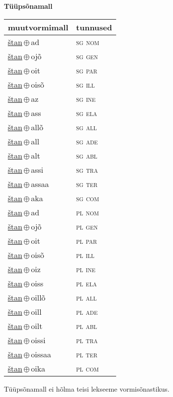 

\vspace{3.5em}
\noindent \begin{minipage}{\textwidth}
\noindent \textbf{Tüüpsõnamall \,}\\

\begin{sideways}
\begin{tabular}{l l}
muutvormimall & tunnused \\
\hline
\underline{štan}\,$\oplus$\,ad & \textsc{ sg nom } \\
\underline{štan}\,$\oplus$\,ojõ & \textsc{ sg gen } \\
\underline{štan}\,$\oplus$\,oit & \textsc{ sg par } \\
\underline{štan}\,$\oplus$\,oisõ & \textsc{ sg ill } \\
\underline{štan}\,$\oplus$\,az & \textsc{ sg ine } \\
\underline{štan}\,$\oplus$\,ass & \textsc{ sg ela } \\
\underline{štan}\,$\oplus$\,allõ & \textsc{ sg all } \\
\underline{štan}\,$\oplus$\,all & \textsc{ sg ade } \\
\underline{štan}\,$\oplus$\,alt & \textsc{ sg abl } \\
\underline{štan}\,$\oplus$\,assi & \textsc{ sg tra } \\
\underline{štan}\,$\oplus$\,assaa & \textsc{ sg ter } \\
\underline{štan}\,$\oplus$\,aka & \textsc{ sg com } \\
\underline{štan}\,$\oplus$\,ad & \textsc{ pl nom } \\
\underline{štan}\,$\oplus$\,ojõ & \textsc{ pl gen } \\
\underline{štan}\,$\oplus$\,oit & \textsc{ pl par } \\
\underline{štan}\,$\oplus$\,oisõ & \textsc{ pl ill } \\
\underline{štan}\,$\oplus$\,oiz & \textsc{ pl ine } \\
\underline{štan}\,$\oplus$\,oiss & \textsc{ pl ela } \\
\underline{štan}\,$\oplus$\,oillõ & \textsc{ pl all } \\
\underline{štan}\,$\oplus$\,oill & \textsc{ pl ade } \\
\underline{štan}\,$\oplus$\,oilt & \textsc{ pl abl } \\
\underline{štan}\,$\oplus$\,oissi & \textsc{ pl tra } \\
\underline{štan}\,$\oplus$\,oissaa & \textsc{ pl ter } \\
\underline{štan}\,$\oplus$\,oika & \textsc{ pl com } \\
\end{tabular}
\end{sideways}
\label{tab:tüüpsõnamall-štanad}

\end{minipage}

 
\vspace{1em}
\noindent Tüüpsõnamall  ei hõlma teisi lekseeme vormi\-sõnastikus.
